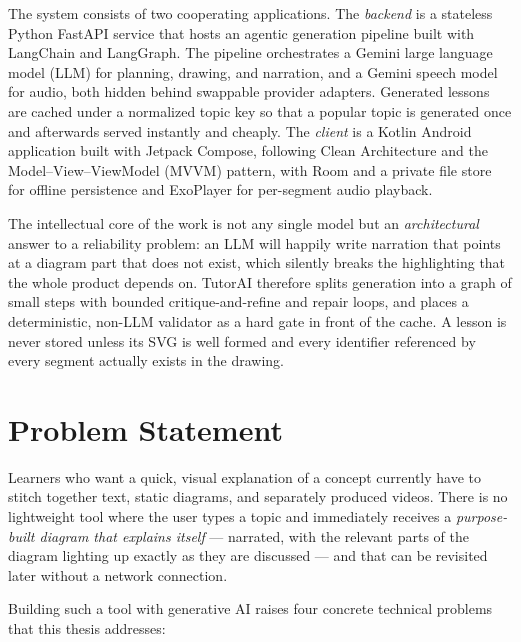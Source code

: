 The system consists of two cooperating applications. The \emph{backend} is a
stateless Python FastAPI service that hosts an agentic generation pipeline
built with LangChain and LangGraph. The pipeline orchestrates a Gemini large
language model (LLM) for planning, drawing, and narration, and a Gemini speech
model for audio, both hidden behind swappable provider adapters. Generated
lessons are cached under a normalized topic key so that a popular topic is
generated once and afterwards served instantly and cheaply. The \emph{client}
is a Kotlin Android application built with Jetpack Compose, following Clean
Architecture and the Model--View--ViewModel (MVVM) pattern, with Room and a
private file store for offline persistence and ExoPlayer for per-segment audio
playback.

The intellectual core of the work is not any single model but an
\emph{architectural} answer to a reliability problem: an LLM will happily
write narration that points at a diagram part that does not exist, which
silently breaks the highlighting that the whole product depends on. TutorAI
therefore splits generation into a graph of small steps with bounded
critique-and-refine and repair loops, and places a deterministic, non-LLM
validator as a hard gate in front of the cache. A lesson is never stored
unless its SVG is well formed and every identifier referenced by every
segment actually exists in the drawing.

\section{Problem Statement}
\label{sec:problem}

Learners who want a quick, visual explanation of a concept currently have to
stitch together text, static diagrams, and separately produced videos. There
is no lightweight tool where the user types a topic and immediately receives a
\emph{purpose-built diagram that explains itself} --- narrated, with the
relevant parts of the diagram lighting up exactly as they are discussed ---
and that can be revisited later without a network connection.

Building such a tool with generative AI raises four concrete technical
problems that this thesis addresses:

